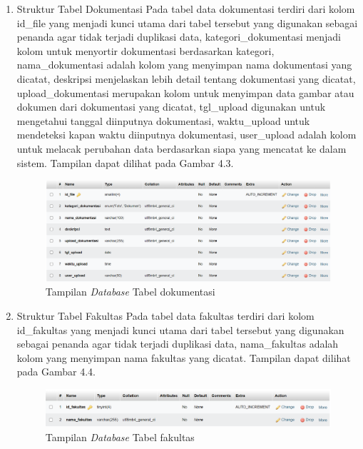 \begin{enumerate}
  \item Struktur Tabel Dokumentasi
        Pada tabel data dokumentasi terdiri dari kolom id\_file yang menjadi kunci utama dari tabel tersebut yang digunakan sebagai penanda agar tidak terjadi duplikasi data, kategori\_dokumentasi menjadi kolom untuk menyortir dokumentasi berdasarkan kategori, nama\_dokumentasi adalah kolom yang menyimpan nama dokumentasi yang dicatat, deskripsi menjelaskan lebih detail tentang dokumentasi yang dicatat,  upload\_dokumentasi merupakan kolom untuk menyimpan data gambar atau dokumen dari dokumentasi yang dicatat, tgl\_upload digunakan untuk mengetahui tanggal diinputnya dokumentasi, waktu\_upload untuk mendeteksi kapan waktu diinputnya dokumentasi, user\_upload adalah kolom untuk melacak perubahan data berdasarkan siapa yang mencatat ke dalam sistem. Tampilan dapat dilihat pada Gambar 4.3.

        \begin{figure}
          \centering
          \includegraphics[width=0.82\linewidth]{konten//gambar/Tampilan database tabel dokumentasi.png}
          \caption{Tampilan \textit{Database} Tabel dokumentasi}
          \label{fig:enter-label}
        \end{figure}

  \item Struktur Tabel Fakultas
        Pada tabel data fakultas terdiri dari kolom id\_fakultas yang menjadi kunci utama dari tabel tersebut yang digunakan sebagai penanda agar tidak terjadi duplikasi data, nama\_fakultas adalah kolom yang menyimpan nama fakultas yang dicatat. Tampilan dapat dilihat pada Gambar 4.4.

        \begin{figure}
          \centering
          \includegraphics[width=0.82\linewidth]{konten//gambar/Tampilan database tabel fakultas.png}
          \caption{Tampilan \textit{Database} Tabel fakultas}
          \label{fig:enter-label}
        \end{figure}


\end{enumerate}

